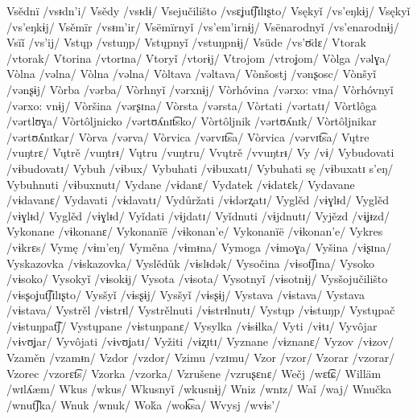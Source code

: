 Vsědnï /vsᵻdn’i/
Vsědy /vsᵻdɨ/
Vsejučilišto /vsɛʝut͡ʃɪlɪʂto/
Vsękyǐ /vs’eŋkɨj/
Vsękyǐ /vs’eŋkɨj/
Vsěmïr /vsᵻm’ir/
Vsëmïrnyǐ /vs’em’irnɨj/
Vsënarodnyǐ /vs’enarodnɨj/
Vsïǐ /vs’ij/
Vstųp /vstuŋp/
Vstųpnyǐ /vstuŋpnɨj/
Vsüde /vs’ʊ̈dɛ/
Vtorak /vtorak/
Vtorina /vtorɪna/
Vtoryǐ /vtorɨj/
Vtrojom /vtroʝom/
Vòlga /vəlɣa/
Vòlna /vəlna/
Vòlna /vəlna/
Vòltava /vəltava/
Vònšostj /vənʂosc/
Vònšyǐ /vənʂɨj/
Vòrba /vərba/
Vòrhnyǐ /vərxnɨj/
Vòrhóvina /vərxo: vɪna/
Vòrhóvnyǐ /vərxo: vnɨj/
Vòršina /vərʂɪna/
Vòrsta /vərsta/
Vòrtati /vərtatɪ/
Vòrtlôga /vərtlʊɣa/
Vòrtôljnicko /vərtʊʎnɪt͡sko/
Vòrtôljnik /vərtʊʎnɪk/
Vòrtôljnikar /vərtʊʎnɪkar/
Vòrva /vərva/
Vòrvica /vərvɪt͡sa/
Vòrvica /vərvɪt͡sa/
Vųtre /vuŋtrɛ/
Vųtrě /vuŋtrᵻ/
Vųtru /vuŋtru/
Vvųtrě /vvuŋtrᵻ/
Vy /vɨ/
Vybudovati /vɨbudovatɪ/
Vybuh /vɨbux/
Vybuhati /vɨbuxatɪ/
Vybuhati sę /vɨbuxatɪ s’eŋ/
Vybuhnuti /vɨbuxnutɪ/
Vydane /vɨdanɛ/
Vydatek /vɨdatɛk/
Vydavane /vɨdavanɛ/
Vydavati /vɨdavatɪ/
Vydůržati /vɨdərʐatɪ/
Vyglěd /vɨɣlᵻd/
Vyglěd /vɨɣlᵻd/
Vyglěd /vɨɣlᵻd/
Vyǐdati /vɨjdatɪ/
Vyǐdnuti /vɨjdnutɪ/
Vyjězd /vɨʝᵻzd/
Vykonane /vɨkonanɛ/
Vykonanïë /vɨkonan’e/
Vykonanïë /vɨkonan’e/
Vykres /vɨkrɛs/
Vymę /vɨm’eŋ/
Vyměna /vɨmᵻna/
Vymoga /vɨmoɣa/
Vyšina /vɨʂɪna/
Vyskazovka /vɨskazovka/
Vyslědůk /vɨslᵻdək/
Vysočina /vɨsot͡ʃɪna/
Vysoko /vɨsoko/
Vysokyǐ /vɨsokɨj/
Vysota /vɨsota/
Vysotnyǐ /vɨsotnɨj/
Vysšojučilišto /vɨsʂoʝut͡ʃɪlɪʂto/
Vysšyǐ /vɨsʂɨj/
Vysšyǐ /vɨsʂɨj/
Vystava /vɨstava/
Vystava /vɨstava/
Vystrěl /vɨstrᵻl/
Vystrělnuti /vɨstrᵻlnutɪ/
Vystųp /vɨstuŋp/
Vystųpač /vɨstuŋpat͡ʃ/
Vystųpane /vɨstuŋpanɛ/
Vysylka /vɨsɨlka/
Vyti /vɨtɪ/
Vyvôjar /vɨvʊʝar/
Vyvôjati /vɨvʊʝatɪ/
Vyžiti /vɨʐɪtɪ/
Vyznane /vɨznanɛ/
Vyzov /vɨzov/
Vzaměn /vzamᵻn/
Vzdor /vzdor/
Vzimu /vzɪmu/
Vzor /vzor/
Vzorar /vzorar/
Vzorec /vzorɛt͡s/
Vzorka /vzorka/
Vzrušene /vzruʂɛnɛ/
Wečj /wɛt͡ɕ/
Willäm /wɪlʎæm/
Wkus /wkus/
Wkusnyǐ /wkusnɨj/
Wniz /wnɪz/
Waǐ /waj/
Wnučka /wnut͡ʃka/
Wnuk /wnuk/
Woḱa /wok͡sa/
Wvysj /wvɨs’/